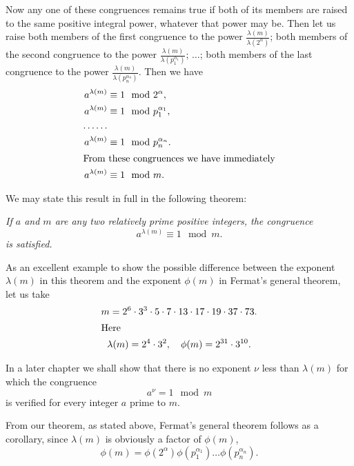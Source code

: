 \documentclass[oneside]{book}
\begin{document}
Now any one of these congruences remains true if both of its members
are raised to the same positive integral power, whatever that power
may be. Then let us raise both members of the first congruence to
the power $\frac{\lambda(m)}{\lambda(2^\alpha)}$; both members of
the second congruence to the power
$\frac{\lambda(m)}{\lambda(p_1^{\alpha_1})}$; $\ldots$; both members
of the last congruence to the power
$\frac{\lambda(m)}{\lambda(p_n^{\alpha_n})}$. Then we have
\begin{align*}
a^{\lambda(m)} &\equiv 1 \mod 2^\alpha, \\
a^{\lambda(m)} &\equiv 1 \mod p_1^{\alpha_1}, \\
\ldots \ldots \\
a^{\lambda(m)} &\equiv 1 \mod p_n^{\alpha_n}. \\
\intertext{From these congruences we have immediately}
a^{\lambda(m)} &\equiv 1 \mod m.
\end{align*}

We may state this result in full in the following theorem:

\smallskip \emph{If $a$ and $m$ are any two relatively prime positive
integers, the congruence}
\begin{equation*}
a^{\lambda(m)} \equiv 1 \mod m.
\end{equation*}
\emph{is satisfied.}

As an excellent example to show the possible difference between the
exponent $\lambda(m)$ in this theorem and the exponent $\phi(m)$ in
Fermat's general theorem, let us take
\begin{gather*}
m = 2^6 \cdot 3^3 \cdot 5 \cdot 7 \cdot 13 \cdot 17 \cdot 19
        \cdot 37 \cdot 73. \\
\intertext{Here}
\lambda(m) = 2^4 \cdot 3^2, \quad \phi(m) = 2^{31} \cdot 3^{10}.
\end{gather*}

In a later chapter we shall show that there is no exponent $\nu$
less than $\lambda(m)$ for which the congruence
\begin{equation*}
a^\nu = 1 \mod m
\end{equation*}
is verified for every integer $a$ prime to $m$.

From our theorem, as stated above, Fermat's general theorem follows
as a corollary, since $\lambda(m)$ is obviously a factor of
$\phi(m)$,
\begin{equation*}
\phi(m) = \phi(2^\alpha) \phi(p_1^{\alpha_1}) \ldots
               \phi(p_n^{\alpha_n}).
\end{equation*}
\end{document}

